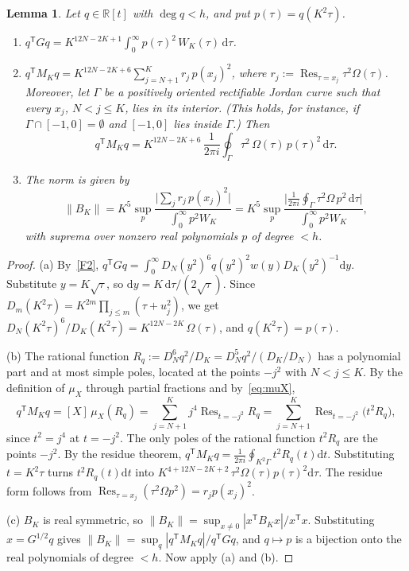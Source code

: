 \documentclass[11pt]{article}
\newtheorem{lemma}{Lemma}
\theoremstyle{remark}
\newcommand{\R}{\mathbb{R}}
\newcommand{\dd}{\mathrm{d}}
\newcommand{\T}{\mathsf{T}}
\DeclareMathOperator{\Res}{Res}
\begin{document}
\begin{lemma}\label{lem:identity}
Let $q\in\R[t]$ with $\deg q<h$, and put $p(\tau)=q(K^2\tau)$.
\begin{enumerate}[label=(\alph*)]
\item $q^\T Gq=K^{12N-2K+1}\int_0^\infty p(\tau)^2\,W_K(\tau)\,\dd\tau$.
\item $q^\T M_Kq=K^{12N-2K+6}\sum_{j=N+1}^Kr_j\,p(x_j)^2$, where $r_j:=\Res_{\tau=x_j}\tau^2\Omega(\tau)$. Moreover, let $\Gamma$ be a positively oriented rectifiable Jordan curve such that every $x_j$, $N<j\le K$, lies in its interior. (This holds, for instance, if $\Gamma\cap[-1,0]=\emptyset$ and $[-1,0]$ lies inside $\Gamma$.) Then
\[
q^\T M_Kq=K^{12N-2K+6}\,\frac1{2\pi i}\oint_\Gamma\tau^2\,\Omega(\tau)\,p(\tau)^2\,\dd\tau .
\]
\item The norm is given by
\[
\|B_K\|=K^5\sup_p\frac{\bigl|\sum_jr_j\,p(x_j)^2\bigr|}{\int_0^\infty p^2W_K}=K^5\sup_p\frac{\bigl|\frac1{2\pi i}\oint_\Gamma\tau^2\Omega\,p^2\,\dd\tau\bigr|}{\int_0^\infty p^2W_K},
\]
with suprema over nonzero real polynomials $p$ of degree $<h$.
\end{enumerate}
\end{lemma}

\begin{proof}
(a) By~\ref{F2}, $q^\T Gq=\int_0^\infty D_N(y^2)^6q(y^2)^2w(y)D_K(y^2)^{-1}\dd y$. Substitute $y=K\sqrt\tau$, so $\dd y=K\,\dd\tau/(2\sqrt\tau)$. Since $D_m(K^2\tau)=K^{2m}\prod_{j\le m}(\tau+u_j^2)$, we get $D_N(K^2\tau)^6/D_K(K^2\tau)=K^{12N-2K}\,\Omega(\tau)$, and $q(K^2\tau)=p(\tau)$.

(b) The rational function $R_q:=D_N^6q^2/D_K=D_N^5q^2/(D_K/D_N)$ has a polynomial part and at most simple poles, located at the points $-j^2$ with $N<j\le K$. By the definition of $\mu_X$ through partial fractions and by~\eqref{eq:muX},
\[
q^\T M_Kq=[X]\,\mu_X(R_q)=\sum_{j=N+1}^Kj^4\Res_{t=-j^2}R_q=\sum_{j=N+1}^K\Res_{t=-j^2}\bigl(t^2R_q\bigr),
\]
since $t^2=j^4$ at $t=-j^2$. The only poles of the rational function $t^2R_q$ are the points $-j^2$. By the residue theorem, $q^\T M_Kq=\frac1{2\pi i}\oint_{K^2\Gamma}t^2R_q(t)\dd t$. Substituting $t=K^2\tau$ turns $t^2R_q(t)\dd t$ into $K^{4+12N-2K+2}\,\tau^2\Omega(\tau)p(\tau)^2\dd\tau$. The residue form follows from $\Res_{\tau=x_j}(\tau^2\Omega p^2)=r_jp(x_j)^2$.

(c) $B_K$ is real symmetric, so $\|B_K\|=\sup_{x\ne0}|x^\T B_Kx|/x^\T x$. Substituting $x=G^{1/2}q$ gives $\|B_K\|=\sup_q|q^\T M_Kq|/q^\T Gq$, and $q\mapsto p$ is a bijection onto the real polynomials of degree $<h$. Now apply (a) and (b).
\end{proof}
\end{document}
